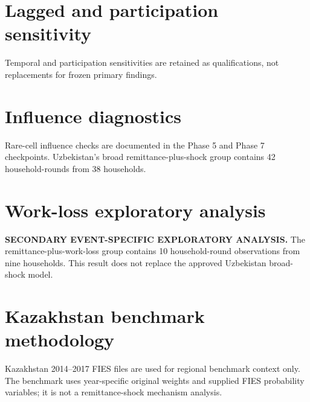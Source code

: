 \section{Lagged and participation sensitivity}
Temporal and participation sensitivities are retained as qualifications, not replacements for frozen primary findings.

\section{Influence diagnostics}
Rare-cell influence checks are documented in the Phase 5 and Phase 7 checkpoints. Uzbekistan's broad remittance-plus-shock group contains 42 household-rounds from 38 households.

\section{Work-loss exploratory analysis}
\textbf{SECONDARY EVENT-SPECIFIC EXPLORATORY ANALYSIS.} The remittance-plus-work-loss group contains 10 household-round observations from nine households. This result does not replace the approved Uzbekistan broad-shock model.

\section{Kazakhstan benchmark methodology}
Kazakhstan 2014--2017 FIES files are used for regional benchmark context only. The benchmark uses year-specific original weights and supplied FIES probability variables; it is not a remittance-shock mechanism analysis.
